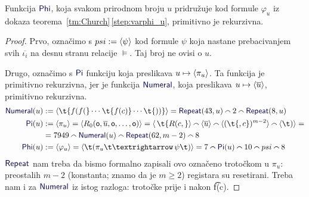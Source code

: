 \begin{lema}[{name=[primitivna rekurzivnost svođenja $K$ na $\Valid$]}]\label{lm:K<Valid}
Funkcija $\f{Phi}$, koja svakom prirodnom broju $u$ pridružuje kod formule $\varphi_u$ iz dokaza teorema~\ref{tm:Church}\,\eqref{step:varphi_u}, primitivno je rekurzivna.
\end{lema}
\begin{proof}
    Prvo, označimo s $psi:=\langle\psi\rangle$ kod formule $\psi$ koja nastane prebacivanjem svih $\overline{\iota_i}$ na desnu stranu relacije $\models$. Taj broj ne ovisi o $u$.

Drugo, označimo s $\f{Pi}$ funkciju koja preslikava $u\mapsto\langle\pi_u\rangle$. Ta funkcija je primitivno rekurzivna, jer je funkcija $\f{Numeral}$, koja preslikava $u\mapsto\langle\overline u\rangle$, primitivno rekurzivna.
\begin{align}
	\f{Numeral}(u)&:=\kr{\t{f(f(}\dotsb\mspace{1mu}\t{f(c)}\dotsm\t{))}}=\f{Repeat}(43,u)\conc{}2\conc{}\f{Repeat}(8,u)\\
    \f{Pi}(u)&:=\kr{\pi_u}=\kr{R_0(\mathsf o,\overline u,\mathsf o,\dotsc,\mathsf o)}=
    \kr{\,\t{R(c,}}\conc{}\kr{\overline u}\conc{}\kr{(\t{,c})^{m-2}}\conc{}\kr{\t)}=\notag\\
    &=7949\conc{}\f{Numeral}(u)\conc{}\f{Repeat}(62,m-2)\conc{}8\\
    \f{Phi}(u)&:=\kr{\varphi_u}=\kr{\t(\pi_u\!\,\t\textrightarrow\,\psi\t)}=7\conc{}\f{Pi}(u)\conc{}10\conc{}psi\conc{}8
\end{align}
    $\f{Repeat}$ nam treba da bismo formalno zapisali ovo označeno trotočkom u $\pi_u$: preostalih $m-2$ (konstanta; znamo da je $m\ge2$) registara su resetirani. Treba nam i za $\f{Numeral}$ iz istog razloga: trotočke prije i nakon \t{f(c)}.
\end{proof}

